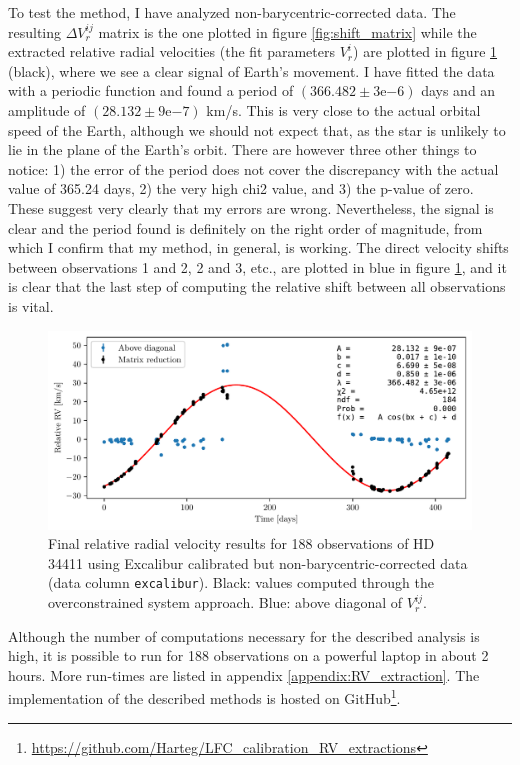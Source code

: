     To test the method, I have analyzed non-barycentric-corrected data. The resulting $\Delta V_r^{ij}$ matrix is the one plotted in figure \ref{fig:shift_matrix} while the extracted relative radial velocities (the fit parameters $V_r^i$) are plotted in figure \ref{fig:RV_results_non_barycentric} (black), where we see a clear signal of Earth's movement. I have fitted the data with a periodic function and found a  period of $(366.482 \pm 3\mathrm{e}{-6})$ days and an amplitude of $(28.132 \pm 9\mathrm{e}{-7})$ km/s. This is very close to the actual orbital speed of the Earth, although we should not expect that, as the star is unlikely to lie in the plane of the Earth's orbit. There are however three other things to notice: 1) the error of the period does not cover the discrepancy with the actual value of 365.24 days, 2) the very high chi2 value, and 3) the p-value of zero. These suggest very clearly that my errors are wrong. Nevertheless, the signal is clear and the period found is definitely on the right order of magnitude, from which I confirm that my method, in general, is working. The direct velocity shifts between observations 1 and 2, 2 and 3, etc.,  are plotted in blue in figure \ref{fig:RV_results_non_barycentric}, and it is clear that the last step of computing the relative shift between all observations is vital.

    \begin{figure}%
        \begin{wide}  
            \includegraphics[width=\textwidth]{figures/shift_non_bary_centric.pdf}
            \caption{Final relative radial velocity results for 188 observations of HD 34411 using Excalibur calibrated but non-barycentric-corrected data (data column \texttt{excalibur}). Black: values computed through the overconstrained system approach. Blue: above diagonal of $V_r^{ij}$.}
            \label{fig:RV_results_non_barycentric}
        \end{wide}
    \end{figure}


    Although the number of computations necessary for the described analysis is high, it is possible to run for 188 observations on a powerful laptop in about 2 hours. More run-times are listed in appendix \ref{appendix:RV_extraction}. The implementation of the described methods is hosted on GitHub\footnote{\url{https://github.com/Harteg/LFC_calibration_RV_extractions}}. 

    
    

